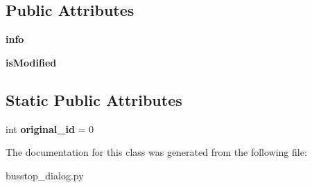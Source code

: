 \subsection*{Public Attributes}
\begin{DoxyCompactItemize}
\item 
\hypertarget{class_sim_g_d_c_1_1busstop__dialog_1_1_busstop_dialog_a42b41009a757d93632f7ac474a5c618c}{}{\bfseries info}\label{class_sim_g_d_c_1_1busstop__dialog_1_1_busstop_dialog_a42b41009a757d93632f7ac474a5c618c}

\item 
\hypertarget{class_sim_g_d_c_1_1busstop__dialog_1_1_busstop_dialog_a3c1d7dbd66809968e6ad87ef6877d0ee}{}{\bfseries is\+Modified}\label{class_sim_g_d_c_1_1busstop__dialog_1_1_busstop_dialog_a3c1d7dbd66809968e6ad87ef6877d0ee}

\end{DoxyCompactItemize}
\subsection*{Static Public Attributes}
\begin{DoxyCompactItemize}
\item 
\hypertarget{class_sim_g_d_c_1_1busstop__dialog_1_1_busstop_dialog_a3534de4f0bfe51e37e5df51500759333}{}int {\bfseries original\+\_\+id} = 0\label{class_sim_g_d_c_1_1busstop__dialog_1_1_busstop_dialog_a3534de4f0bfe51e37e5df51500759333}

\end{DoxyCompactItemize}


The documentation for this class was generated from the following file\+:\begin{DoxyCompactItemize}
\item 
busstop\+\_\+dialog.\+py\end{DoxyCompactItemize}
